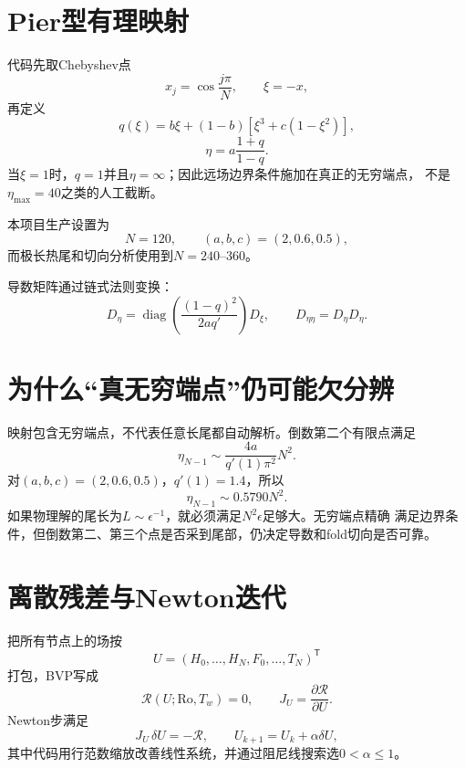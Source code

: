 \documentclass[UTF8,zihao=-4,openany]{ctexbook}
\newcommand{\eps}{\epsilon}
\newcommand{\Ro}{\mathrm{Ro}}
\newcommand{\R}{\mathcal R}
\begin{document}
\section{Pier型有理映射}

代码先取Chebyshev点
\begin{equation}
 x_j=\cos\frac{j\pi}{N},\qquad \xi=-x,
\end{equation}
再定义
\begin{equation}
 q(\xi)=b\xi+(1-b)\left[\xi^3+c(1-\xi^2)\right],
\end{equation}
\begin{equation}\label{eq:mapping}
 \boxed{\eta=a\frac{1+q}{1-q}.}
\end{equation}
当$\xi=1$时，$q=1$并且$\eta=\infty$；因此远场边界条件施加在真正的无穷端点，
不是$\eta_{\max}=40$之类的人工截断。

本项目生产设置为
\begin{equation}
  N=120,\qquad (a,b,c)=(2,0.6,0.5),
\end{equation}
而极长热尾和切向分析使用到$N=240$--$360$。

导数矩阵通过链式法则变换：
\begin{equation}
 D_\eta=\operatorname{diag}\left(\frac{(1-q)^2}{2a q'}\right)D_\xi,
 \qquad D_{\eta\eta}=D_\eta D_\eta.
\end{equation}

\section{为什么“真无穷端点”仍可能欠分辨}

映射包含无穷端点，不代表任意长尾都自动解析。倒数第二个有限点满足
\begin{equation}\label{eq:etamaxN}
 \eta_{N-1}\sim\frac{4a}{q'(1)\pi^2}N^2.
\end{equation}
对$(a,b,c)=(2,0.6,0.5)$，$q'(1)=1.4$，所以
\begin{equation}
 \boxed{\eta_{N-1}\sim0.5790N^2.}
\end{equation}
如果物理解的尾长为$L\sim\eps^{-1}$，就必须满足$N^2\eps$足够大。无穷端点精确
满足边界条件，但倒数第二、第三个点是否采到尾部，仍决定导数和fold切向是否可靠。

\section{离散残差与Newton迭代}

把所有节点上的场按
\begin{equation}
 U=(H_0,\ldots,H_N,F_0,\ldots,T_N)^\mathsf{T}
\end{equation}
打包，BVP写成
\begin{equation}
 \R(U;\Ro,T_w)=0,
 \qquad J_U=\frac{\partial\R}{\partial U}.
\end{equation}
Newton步满足
\begin{equation}
 J_U\,\delta U=-\R,\qquad U_{k+1}=U_k+\alpha\delta U,
\end{equation}
其中代码用行范数缩放改善线性系统，并通过阻尼线搜索选$0<\alpha\le1$。
\end{document}
